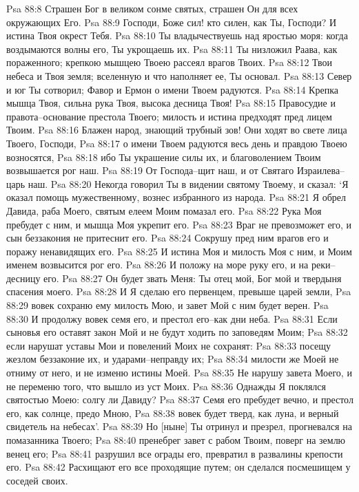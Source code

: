 Psa 88:8  Страшен Бог в великом сонме святых, страшен Он для всех окружающих Его.
Psa 88:9  Господи, Боже сил! кто силен, как Ты, Господи? И истина Твоя окрест Тебя.
Psa 88:10  Ты владычествуешь над яростью моря: когда воздымаются волны его, Ты укрощаешь их.
Psa 88:11  Ты низложил Раава, как пораженного; крепкою мышцею Твоею рассеял врагов Твоих.
Psa 88:12  Твои небеса и Твоя земля; вселенную и что наполняет ее, Ты основал.
Psa 88:13  Север и юг Ты сотворил; Фавор и Ермон о имени Твоем радуются.
Psa 88:14  Крепка мышца Твоя, сильна рука Твоя, высока десница Твоя!
Psa 88:15  Правосудие и правота--основание престола Твоего; милость и истина предходят пред лицем Твоим.
Psa 88:16  Блажен народ, знающий трубный зов! Они ходят во свете лица Твоего, Господи,
Psa 88:17  о имени Твоем радуются весь день и правдою Твоею возносятся,
Psa 88:18  ибо Ты украшение силы их, и благоволением Твоим возвышается рог наш.
Psa 88:19  От Господа--щит наш, и от Святаго Израилева--царь наш.
Psa 88:20  Некогда говорил Ты в видении святому Твоему, и сказал: `Я оказал помощь мужественному, вознес избранного из народа.
Psa 88:21  Я обрел Давида, раба Моего, святым елеем Моим помазал его.
Psa 88:22  Рука Моя пребудет с ним, и мышца Моя укрепит его.
Psa 88:23  Враг не превозможет его, и сын беззакония не притеснит его.
Psa 88:24  Сокрушу пред ним врагов его и поражу ненавидящих его.
Psa 88:25  И истина Моя и милость Моя с ним, и Моим именем возвысится рог его.
Psa 88:26  И положу на море руку его, и на реки--десницу его.
Psa 88:27  Он будет звать Меня: Ты отец мой, Бог мой и твердыня спасения моего.
Psa 88:28  И Я сделаю его первенцем, превыше царей земли,
Psa 88:29  вовек сохраню ему милость Мою, и завет Мой с ним будет верен.
Psa 88:30  И продолжу вовек семя его, и престол его--как дни неба.
Psa 88:31  Если сыновья его оставят закон Мой и не будут ходить по заповедям Моим;
Psa 88:32  если нарушат уставы Мои и повелений Моих не сохранят:
Psa 88:33  посещу жезлом беззаконие их, и ударами--неправду их;
Psa 88:34  милости же Моей не отниму от него, и не изменю истины Моей.
Psa 88:35  Не нарушу завета Моего, и не переменю того, что вышло из уст Моих.
Psa 88:36  Однажды Я поклялся святостью Моею: солгу ли Давиду?
Psa 88:37  Семя его пребудет вечно, и престол его, как солнце, предо Мною,
Psa 88:38  вовек будет тверд, как луна, и верный свидетель на небесах'.
Psa 88:39  Но [ныне] Ты отринул и презрел, прогневался на помазанника Твоего;
Psa 88:40  пренебрег завет с рабом Твоим, поверг на землю венец его;
Psa 88:41  разрушил все ограды его, превратил в развалины крепости его.
Psa 88:42  Расхищают его все проходящие путем; он сделался посмешищем у соседей своих.
